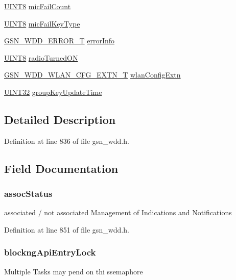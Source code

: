 \begin{DoxyCompactItemize}
\item 
\hyperlink{a00660_gab27e9918b538ce9d8ca692479b375b6a}{UINT8} \hyperlink{a00108_af6a8c884eb70e7571ac6430c63ec5df4}{micFailCount}
\item 
\hyperlink{a00660_gab27e9918b538ce9d8ca692479b375b6a}{UINT8} \hyperlink{a00108_a3698e45da8aee10ecc705544d6a08d67}{micFailKeyType}
\item 
\hyperlink{a00274}{GSN\_\-WDD\_\-ERROR\_\-T} \hyperlink{a00108_a793f4df4f0aeaae2a47d5f241c58888c}{errorInfo}
\item 
\hyperlink{a00660_gab27e9918b538ce9d8ca692479b375b6a}{UINT8} \hyperlink{a00108_a7d0790675b676ebbb64b9e32c44d967b}{radioTurnedON}
\item 
\hyperlink{a00303}{GSN\_\-WDD\_\-WLAN\_\-CFG\_\-EXTN\_\-T} \hyperlink{a00108_ae1f41411bdffd481f74e4f07ed263c47}{wlanConfigExtn}
\item 
\hyperlink{a00660_gae1e6edbbc26d6fbc71a90190d0266018}{UINT32} \hyperlink{a00108_adc9045c1c06adcde56a323e42f827f57}{groupKeyUpdateTime}
\end{DoxyCompactItemize}


\subsection{Detailed Description}


Definition at line 836 of file gsn\_\-wdd.h.



\subsection{Field Documentation}
\hypertarget{a00108_aefbdac2d3871268bf15bf14ec0130f96}{
\subsubsection[{assocStatus}]{ {\bf assocStatus}}}
\label{a00108_aefbdac2d3871268bf15bf14ec0130f96}
associated / not associated Management of Indications and Notifications 

Definition at line 851 of file gsn\_\-wdd.h.

\hypertarget{a00108_a1375db10dcc5c2669543b8bdea7c9294}{
\subsubsection[{blockngApiEntryLock}]{ {\bf blockngApiEntryLock}}}
\label{a00108_a1375db10dcc5c2669543b8bdea7c9294}
Multiple Tasks may pend on thi ssemaphore 


